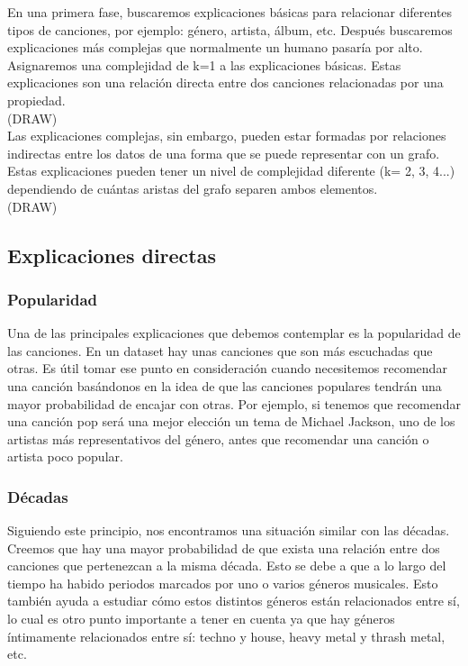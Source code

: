 En una primera fase, buscaremos explicaciones básicas para relacionar diferentes tipos de canciones, por ejemplo: género, artista, álbum, etc. Después buscaremos explicaciones más complejas que normalmente un humano pasaría por alto. Asignaremos una complejidad de k=1 a las explicaciones básicas. Estas explicaciones son una relación directa entre dos canciones relacionadas por una propiedad.\\

(DRAW)\\

Las explicaciones complejas, sin embargo, pueden estar formadas por relaciones indirectas entre los datos de una forma que se puede representar con un grafo. Estas explicaciones pueden tener un nivel de complejidad diferente (k= 2, 3, 4...) dependiendo de cuántas aristas del grafo separen ambos elementos.\\

(DRAW)\\


\subsection{Explicaciones directas}

\subsubsection*{Popularidad}

Una de las principales explicaciones que debemos contemplar es la popularidad de las canciones. En un dataset hay unas canciones que son más escuchadas que otras. Es útil tomar ese punto en consideración cuando necesitemos recomendar una canción basándonos en la idea de que las canciones populares tendrán una mayor probabilidad de encajar con otras. Por ejemplo, si tenemos que recomendar una canción pop será una mejor elección un tema de Michael Jackson, uno de los artistas más representativos del género, antes que recomendar una canción o artista poco popular.

\subsubsection*{Décadas}

Siguiendo este principio, nos encontramos una situación similar con las décadas. Creemos que hay una mayor probabilidad de que exista una relación entre dos canciones que pertenezcan a la misma década. Esto se debe a que a lo largo del tiempo ha habido periodos marcados por uno o varios géneros musicales. Esto también ayuda a estudiar cómo estos distintos géneros están relacionados entre sí, lo cual es otro punto importante a tener en cuenta ya que hay géneros íntimamente relacionados entre sí: techno y house, heavy metal y thrash metal, etc.

